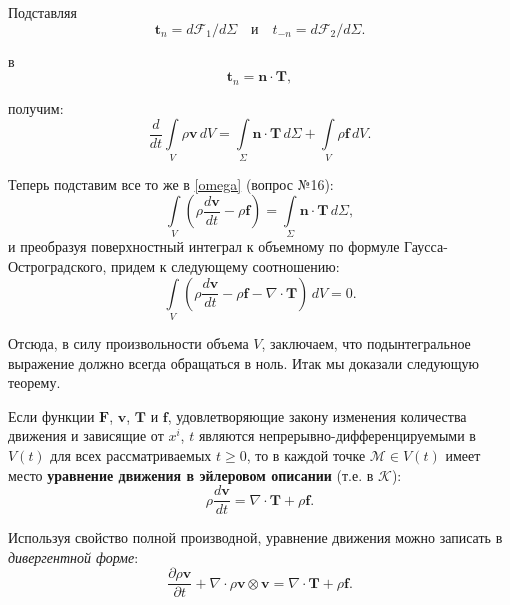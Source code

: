 
Подставляя 
\begin{equation*}
	\mathbf{t}_{n} = d\mathcal{F}_1 / d\Sigma \quad \text{и} \quad t_{-n} = d\mathcal{F}_2 / d\Sigma.
\end{equation*}

в
\begin{equation*}
	\mathbf{t}_n = \mathbf{n} \cdot \mathbf{T},
\end{equation*}

получим:
\begin{equation*}
	\frac{d}{dt} \int\limits_{V} \rho \mathbf{v} \, dV = \int\limits_{\Sigma} \mathbf{n} \cdot \mathbf{T} \, d\Sigma + \int\limits_{V} \rho \mathbf{f} \, dV.
\end{equation*}

Теперь подставим все то же в \eqref{omega} (вопрос №16):
\begin{equation*}
	\int\limits_{V} \left(\rho \frac{d\mathbf{v}}{dt} - \rho \mathbf{f}\right) = \int\limits_{\Sigma} \mathbf{n} \cdot \mathbf{T} \, d\Sigma,
\end{equation*}
и преобразуя поверхностный интеграл к объемному по формуле Гаусса-Остроградского, придем к следующему соотношению:
\begin{equation*}
	\int\limits_{V} \left(\rho \frac{d \mathbf{v}}{dt} - \rho \mathbf{f} - \nabla \cdot \mathbf{T}\right) \, dV = 0.
\end{equation*}

Отсюда, в силу произвольности объема $V$, заключаем, что подынтегральное выражение должно всегда обращаться в ноль. Итак мы доказали следующую теорему.

\begin{theorem*}
	Если функции $\mathbf{F}$, $\mathbf{v}$, $\mathbf{T}$ и $\mathbf{f}$, удовлетворяющие закону изменения количества движения и зависящие от $x^i$, $t$ являются непрерывно-дифференцируемыми в $V(t)$ для всех рассматриваемых $t \geqslant 0$, то в каждой точке $\mathcal{M} \in V(t)$ имеет место \textbf{уравнение движения в эйлеровом описании} (т.е. в $\mathcal{K}$):
	\begin{equation*}
		\rho \frac{d\mathbf{v}}{dt} = \nabla \cdot \mathbf{T} + \rho \mathbf{f}.
	\end{equation*}
\end{theorem*}


Используя свойство полной производной, уравнение движения можно записать в \textit{дивергентной форме}:
\begin{equation*}
	\frac{\partial \rho \mathbf{v}}{\partial t} + \nabla \cdot \rho \mathbf{v} \otimes \mathbf{v} = \nabla \cdot \mathbf{T} + \rho \mathbf{f}.
\end{equation*}

